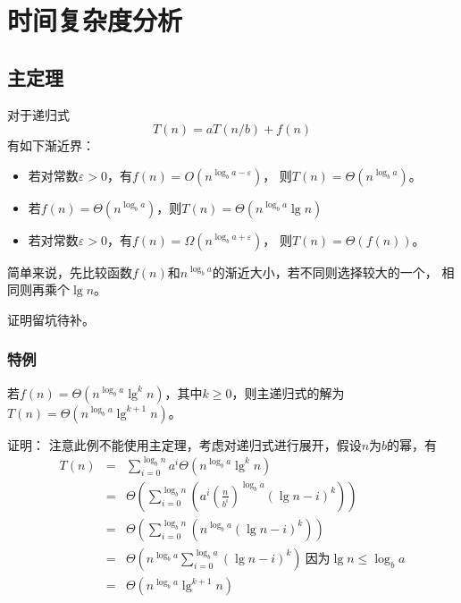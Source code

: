 \section{时间复杂度分析}
\subsection{主定理}
\begin{theorem}
	对于递归式
	\begin{displaymath}
		T(n)=aT(n/b)+f(n)
	\end{displaymath}
	有如下渐近界：
	\begin{itemize}
		\item 若对常数$\varepsilon>0$，有$f(n)=O(n^{\log_b{a-\varepsilon}})$，
		      则$T(n)=\Theta(n^{\log_ba})$。
		\item 若$f(n)=\Theta(n^{\log_ba})$，则$T(n)=\Theta(n^{\log_ba}\lg n)$
		\item 若对常数$\varepsilon>0$，有$f(n)=\Omega(n^{\log_b{a+\varepsilon}})$，
		      则$T(n)=\Theta(f(n))$。
	\end{itemize}
\end{theorem}
简单来说，先比较函数$f(n)$和$n^{\log_ba}$的渐近大小，若不同则选择较大的一个，
相同则再乘个$\lg n$。

证明留坑待补。
\subsubsection{特例}
\begin{theorem}
	若$f(n)=\Theta(n^{\log_ba}\lg^kn)$，其中$k\geq 0$，则主递归式的解为\\
	$T(n)=\Theta(n^{\log_ba}\lg^{k+1}n)$。
\end{theorem}
证明：
注意此例不能使用主定理，考虑对递归式进行展开，假设$n$为$b$的幂，有
\begin{eqnarray*}
	T(n)&=&\sum_{i=0}^{\log_bn}{a^i\Theta(n^{\log_ba}\lg^kn)}\\
	&=&\Theta\left(\sum_{i=0}^{\log_bn}{\left(a^i\left(\frac{n}{b^i}\right)^
				{\log_b a}(\lg n-i)^k\right)}\right)\\
	&=&\Theta\left(\sum_{i=0}^{\log_bn}{\left(n^{\log_ba}
	(\lg n-i)^k\right)}\right)\\
	&=&\Theta\left(n^{\log_ba}\sum_{i=0}^{\log_ba}{(\lg n-i)^k}\right)
	~\textrm{因为}\lg n\leq \log_ba\\
	&=&\Theta\left(n^{\log_ba}\lg^{k+1}n\right)
\end{eqnarray*}

